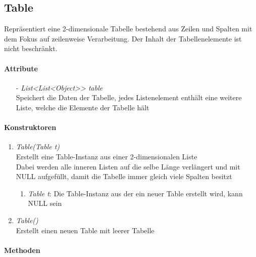 \subsection{Table}
Repräsentiert eine 2-dimensionale Tabelle bestehend aus Zeilen und Spalten mit dem Fokus auf zeilenweise Verarbeitung. Der Inhalt der Tabellenelemente ist nicht beschränkt.


\paragraph{Attribute}

\begin{itemize}
	\item[-] \textit{List{<List<Object>}> table} \\
	Speichert die Daten der Tabelle, jedes Listenelement enthält eine weitere Liste, welche die Elemente der Tabelle hält
\end{itemize}

\paragraph{Konstruktoren}

\begin{enumerate}[+]
	\item \textit{Table(Table t)} \\
	Erstellt eine Table-Instanz aus einer 2-dimensionalen Liste \\
	Dabei werden alle inneren Listen auf die selbe Länge verlängert und mit NULL aufgefüllt, damit die Tabelle immer gleich viele Spalten besitzt	
	\begin{enumerate}[$\bullet$]
		\item \textit{Table t}: Die Table-Instanz aus der ein neuer Table erstellt wird, kann NULL sein
	\end{enumerate}
	\vspace{-0.2cm}
	\item \textit{Table()} \\
	Erstellt einen neuen Table mit leerer Tabelle
\end{enumerate}
			
\paragraph{Methoden}

